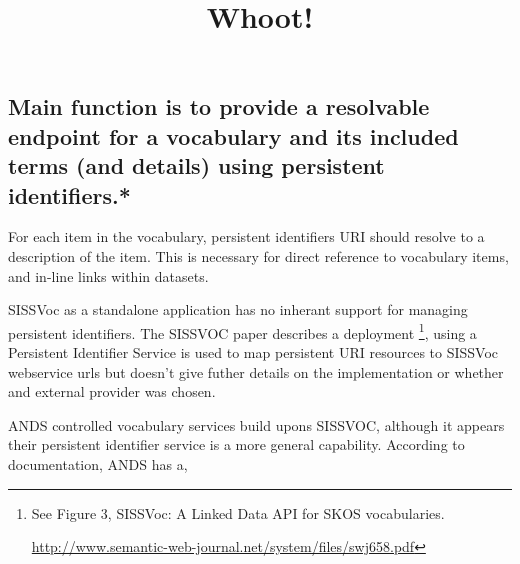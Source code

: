 \documentclass[10pt,a4paper]{article}
\title{Whoot!}
\date{}
\newenvironment{italicquotes}
{\begin{quote}\itshape}
{\end{quote}}
\let\Item\item
\newcommand\SpecialItem{\renewcommand\item[1][]{\Item[\textbullet~\bfseries##1]}}
\begin{document}
\SpecialItem

  \maketitle
    \begin{flushleft}
  \setlength{\parindent}{5ex}

% 
% 


  \subsection{
   Main function is to provide a resolvable endpoint for a vocabulary and its
  included terms (and details) using persistent identifiers.* 
  }

  For each item in the vocabulary, persistent identifiers {URI} should
  resolve to a description of the item.  This is necessary for direct reference to
  vocabulary items, and in-line links within datasets.

  \item[SISSVoc] as a standalone application has no inherant support for managing persistent
  identifiers. The SISSVOC paper describes a deployment \footnote{ See Figure 3,
  SISSVoc: A Linked Data API for SKOS vocabularies.

  \url{http://www.semantic-web-journal.net/system/files/swj658.pdf} }, using a
  Persistent Identifier Service is used to map persistent URI resources to SISSVoc
  webservice urls but doesn't give futher details on the implementation or
  whether and external provider was chosen. 

  \item[ANDS] controlled vocabulary services build upons SISSVOC, although it appears
  their persistent identifier service is a more general capability. According to
  documentation, ANDS has a, 


\end{flushleft}
\end{document}
